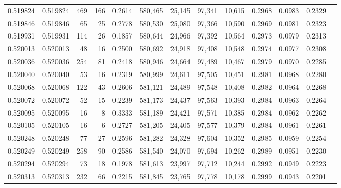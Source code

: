 \begin{tabular}{rrrrrrrrrrrrr}
0.519824 & 0.519824 &   469 &   166 &                                     0.2614 & 580,465 &  25,145 &  97,341 &  10,615 & 0.2968 & 0.0983 & 0.2329 \\
0.519846 & 0.519846 &    65 &    25 &                                     0.2778 & 580,530 &  25,080 &  97,366 &  10,590 & 0.2969 & 0.0981 & 0.2323 \\
0.519931 & 0.519931 &   114 &    26 &                                     0.1857 & 580,644 &  24,966 &  97,392 &  10,564 & 0.2973 & 0.0979 & 0.2313 \\
0.520013 & 0.520013 &    48 &    16 &                                     0.2500 & 580,692 &  24,918 &  97,408 &  10,548 & 0.2974 & 0.0977 & 0.2308 \\
0.520036 & 0.520036 &   254 &    81 &                                     0.2418 & 580,946 &  24,664 &  97,489 &  10,467 & 0.2979 & 0.0970 & 0.2285 \\
0.520040 & 0.520040 &    53 &    16 &                                     0.2319 & 580,999 &  24,611 &  97,505 &  10,451 & 0.2981 & 0.0968 & 0.2280 \\
0.520068 & 0.520068 &   122 &    43 &                                     0.2606 & 581,121 &  24,489 &  97,548 &  10,408 & 0.2982 & 0.0964 & 0.2268 \\
0.520072 & 0.520072 &    52 &    15 &                                     0.2239 & 581,173 &  24,437 &  97,563 &  10,393 & 0.2984 & 0.0963 & 0.2264 \\
0.520095 & 0.520095 &    16 &     8 &                                     0.3333 & 581,189 &  24,421 &  97,571 &  10,385 & 0.2984 & 0.0962 & 0.2262 \\
0.520105 & 0.520105 &    16 &     6 &                                     0.2727 & 581,205 &  24,405 &  97,577 &  10,379 & 0.2984 & 0.0961 & 0.2261 \\
0.520248 & 0.520248 &    77 &    27 &                                     0.2596 & 581,282 &  24,328 &  97,604 &  10,352 & 0.2985 & 0.0959 & 0.2254 \\
0.520249 & 0.520249 &   258 &    90 &                                     0.2586 & 581,540 &  24,070 &  97,694 &  10,262 & 0.2989 & 0.0951 & 0.2230 \\
0.520294 & 0.520294 &    73 &    18 &                                     0.1978 & 581,613 &  23,997 &  97,712 &  10,244 & 0.2992 & 0.0949 & 0.2223 \\
0.520313 & 0.520313 &   232 &    66 &                                     0.2215 & 581,845 &  23,765 &  97,778 &  10,178 & 0.2999 & 0.0943 & 0.2201 \\

\end{tabular}
